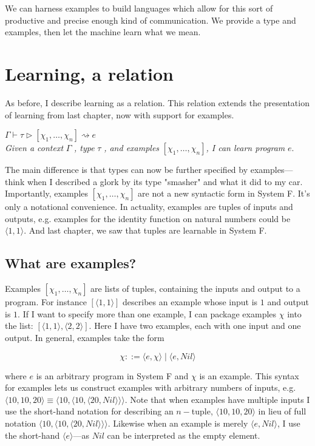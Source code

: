 We can harness examples to build languages which allow for this sort of productive and precise enough kind of communication. We provide a type and examples, then let the machine learn what we mean. 

\section{Learning, a relation}

As before, I describe learning as a relation. This relation extends the presentation of learning from last chapter, now with support for examples.
\begin{displayquote}
\centering
$\Gamma \vdash \tau \rhd [\chi_1,\dots,\chi_n] \rightsquigarrow e$\\
\textit{Given a context} $\Gamma$ \textit{, type} $\tau$ \textit{, and examples} $[\chi_1,\dots,\chi_n]$\textit{, I can learn program} $e$.
\end{displayquote}

The main difference is that types can now be further specified by examples---think when I described a glork by its type "smasher" and what it did to my car. Importantly, examples $[\chi_1,\dots,\chi_n]$ are not a new syntactic form in System F. It's only a notational convenience. In actuality, examples are tuples of inputs and outputs, e.g. examples for the identity function on natural numbers could be $\langle 1,1\rangle$. And last chapter, we saw that tuples are learnable in System F.

\subsection{What are examples?}

Examples $[\chi_1,\dots,\chi_n]$ are lists of tuples, containing the inputs and output to a program. For instance $[\langle1,1\rangle]$ describes an example whose input is $1$ and output is $1$. If I want to specify more than one example, I can package examples $\chi$ into the list: $[\langle 1,1\rangle, \langle2,2\rangle]$. Here I have two examples, each with one input and one output. In general, examples take the form \vspace{-1.0em}
\begin{singlespace}
$$\chi ::= \langle e, \chi\rangle \mid \langle e,Nil\rangle$$
\end{singlespace}
where $e$ is an arbitrary program in System F and $\chi$ is an example. This syntax for examples lets us construct examples with arbitrary numbers of inputs, e.g. $\langle10,10,20\rangle \equiv \langle 10, \langle 10, \langle 20,Nil\rangle\rangle\rangle.$ Note that when examples have multiple inputs I use the short-hand notation for describing an $n-$tuple, $\langle10,10,20\rangle$ in lieu of full notation $ \langle 10, \langle 10, \langle 20,Nil\rangle\rangle\rangle$. Likewise when an example is merely $\langle e,Nil\rangle$, I use the short-hand $\langle e\rangle$---as $Nil$ can be interpreted as the empty element.

